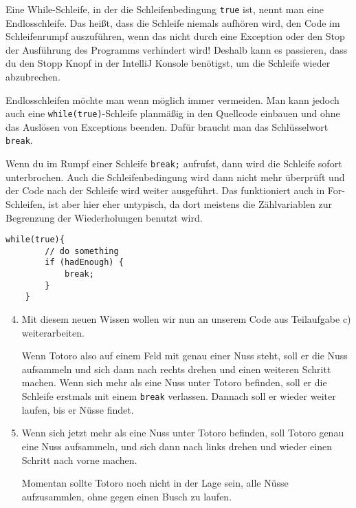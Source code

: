 \begin{Infobox}
	Eine While-Schleife, in der die Schleifenbedingung \lstinline{true} ist, nennt man eine Endlosschleife.
	Das heißt, dass die Schleife niemals aufhören wird, den Code im Schleifenrumpf auszuführen, wenn das nicht durch eine Exception oder den Stop der Ausführung des Programms verhindert wird!
	Deshalb kann es passieren, dass du den Stopp Knopf in der IntelliJ Konsole benötigst, um die Schleife wieder abzubrechen.\newline

	Endlosschleifen möchte man wenn  möglich immer vermeiden.
	Man kann jedoch auch eine \lstinline{while(true)}-Schleife planmäßig in den Quellcode einbauen und ohne das Auslösen von Exceptions beenden.
	Dafür braucht man das Schlüsselwort \lstinline{break}.\newline

	Wenn du im Rumpf einer Schleife \lstinline{break;} aufrufst, dann wird die Schleife sofort unterbrochen.
	Auch die Schleifenbedingung wird dann nicht mehr überprüft und der Code nach der Schleife wird weiter ausgeführt.
	Das funktioniert auch in For-Schleifen, ist aber hier eher untypisch, da  dort meistens die Zählvariablen zur Begrenzung der Wiederholungen benutzt wird.

	\begin{lstlisting}[numbers=none]
	while(true){
		// do something
		if (hadEnough) {
			break;
		}
	}
	\end{lstlisting}

\end{Infobox}


\begin{enumerate}\setcounter{enumi}{3}
	\item
	Mit diesem neuen Wissen wollen wir nun an unserem Code aus Teilaufgabe c) weiterarbeiten.

	Wenn Totoro also auf einem Feld mit genau einer Nuss steht, soll er die Nuss aufsammeln und 
	sich dann nach rechts drehen und einen weiteren Schritt machen.
	Wenn sich mehr als eine Nuss unter Totoro befinden, soll er die Schleife erstmals mit einem \lstinline{break} verlassen.
	Dannach soll er wieder weiter laufen, bis er Nüsse findet.	
	\item
	Wenn sich jetzt mehr als eine Nuss unter Totoro befinden, 
	soll Totoro genau eine Nuss aufsammeln, und sich dann nach links drehen und  wieder einen Schritt nach vorne machen.
	
	Momentan sollte Totoro noch nicht in der Lage sein, alle Nüsse aufzusammlen, ohne gegen einen Busch zu laufen.
	\end{enumerate}
	
